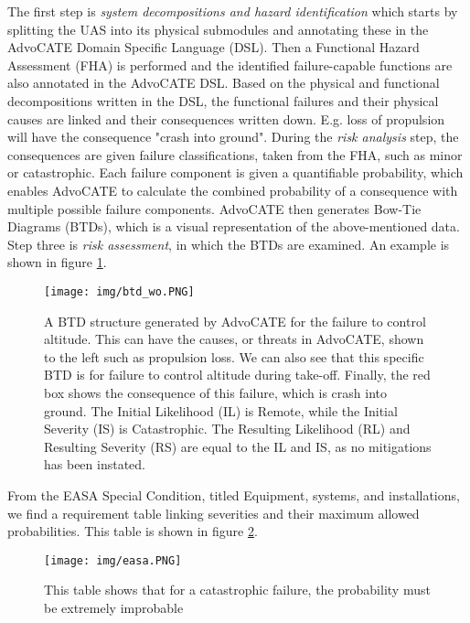 \documentclass[10pt,a4paper]{report}
\begin{document}
The first step is \textit{system decompositions and hazard identification} which starts by splitting the UAS into its physical submodules and annotating these in the AdvoCATE Domain Specific Language (DSL). Then a Functional Hazard Assessment (FHA) is performed and the identified failure-capable functions are also annotated in the AdvoCATE DSL. Based on the physical and functional decompositions written in the DSL, the functional failures and their physical causes are linked and their consequences written down. E.g. loss of propulsion will have the consequence "crash into ground". During the \textit{risk analysis} step, the consequences are given failure classifications, taken from the FHA, such as minor or catastrophic. Each failure component is given a quantifiable probability, which enables AdvoCATE to calculate the combined probability of a consequence with multiple possible failure components. AdvoCATE then generates Bow-Tie Diagrams (BTDs), which is a visual representation of the above-mentioned data. Step three is \textit{risk assessment}, in which the BTDs are examined. An example is shown in figure \ref{fig:btd_wo}.

\begin{figure}[h!]
    \centering
    \texttt{[image: img/btd\_wo.PNG]}
    \caption{A BTD structure generated by AdvoCATE for the failure to control altitude. This can have the causes, or threats in AdvoCATE, shown to the left such as propulsion loss. We can also see that this specific BTD is for failure to control altitude during take-off. Finally, the red box shows the consequence of this failure, which is crash into ground. The Initial Likelihood (IL) is Remote, while the Initial Severity (IS) is Catastrophic. The Resulting Likelihood (RL) and Resulting Severity (RS) are equal to the IL and IS, as no mitigations has been instated.}
    \label{fig:btd_wo}
\end{figure}

From the EASA Special Condition, titled Equipment, systems, and installations\cite{SC2015}, we find a requirement table linking severities and their maximum allowed probabilities. This table is shown in figure \ref{fig:easa}. 

\begin{figure}[h!]
    \centering
    \texttt{[image: img/easa.PNG]}
    \caption{This table shows that for a catastrophic failure, the probability must be extremely improbable\cite{SC2015}}
    \label{fig:easa}
\end{figure}
\end{document}
